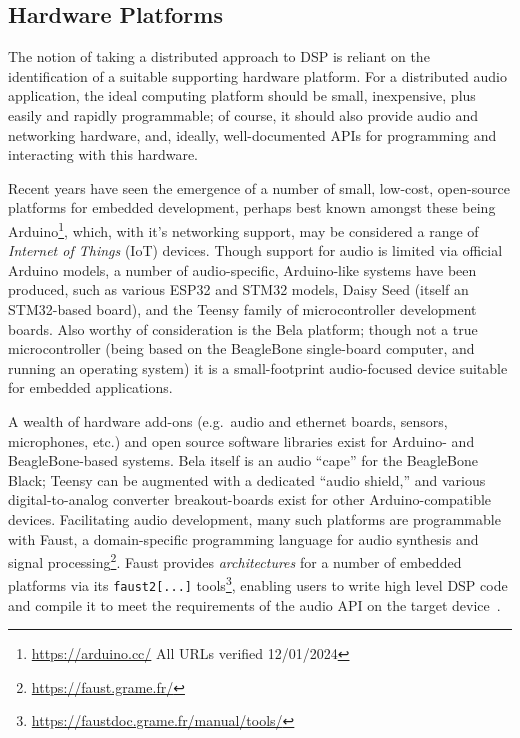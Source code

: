 \subsection{Hardware Platforms}\label{subsec:hardware-platforms}

The notion of taking a distributed approach to DSP is reliant on the
identification of a suitable supporting hardware platform.
For a distributed audio application, the ideal computing platform should be
small, inexpensive, plus easily and rapidly programmable;
of course, it should also provide audio and networking hardware, and, ideally,
well-documented APIs for programming and interacting with this hardware.

Recent years have seen the emergence of a number of small, low-cost, open-source
platforms for embedded development, perhaps best known amongst these being
Arduino\footnote{\url{https://arduino.cc/} \textemdash{} All URLs verified
12/01/2024}, which, with it's networking support, may be considered a range of
\textit{Internet of Things} (IoT) devices.
Though support for audio is limited via official Arduino models, a number of
audio-specific, Arduino-like systems have been produced, such as various
ESP32 and STM32 models, Daisy Seed (itself an STM32-based board), and the Teensy
family of microcontroller development boards.
Also worthy of consideration is the Bela platform; though not a true
microcontroller (being based on the BeagleBone single-board computer, and
running an operating system) it is a small-footprint audio-focused device
suitable for embedded applications.

A wealth of hardware add-ons (e.g.\ audio and ethernet boards, sensors,
microphones, etc.) and open source software libraries exist for Arduino- and
BeagleBone-based systems.
Bela itself is an audio ``cape'' for the BeagleBone Black; Teensy can be
augmented with a dedicated ``audio shield,'' and various digital-to-analog
converter breakout-boards exist for other Arduino-compatible devices.
Facilitating audio development, many such platforms are programmable with
Faust, a domain-specific programming language for audio synthesis and signal
processing\footnote{\url{https://faust.grame.fr/}}.
Faust provides \textit{architectures} for a number of embedded platforms via its
\texttt{faust2[...]} tools\footnote{
    \url{https://faustdoc.grame.fr/manual/tools/}
}, enabling users to write high level DSP code and compile it to meet the
requirements of the audio API on the target device~\citep{michon_real_2019,
    michon_embedded_2020}.

